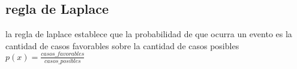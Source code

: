 \subsection{regla de Laplace}
la regla de laplace establece que la probabilidad de que ocurra un evento es la cantidad de casos favorables sobre la cantidad de casos posibles\\
$p(x)=\frac{casos\_favorables}{casos\_posibles}$
